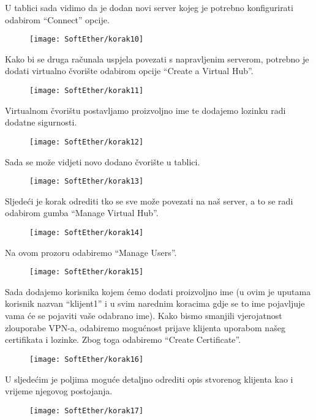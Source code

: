 \FloatBarrier
U tablici sada vidimo da je dodan novi server kojeg je potrebno konfigurirati odabirom ``Connect'' opcije.
\begin{figure}[h!]
     \centering
     \texttt{[image: SoftEther/korak10]}
\end{figure}
\FloatBarrier
Kako bi se druga računala uspjela povezati s napravljenim serverom, potrebno je dodati virtualno čvorište odabirom opcije ``Create a Virtual Hub''.
\begin{figure}[h!]
     \centering
     \texttt{[image: SoftEther/korak11]}
\end{figure}
\FloatBarrier
Virtualnom čvorištu postavljamo proizvoljno ime te dodajemo lozinku radi dodatne sigurnosti.
\begin{figure}[h!]
     \centering
     \texttt{[image: SoftEther/korak12]}
\end{figure}
\FloatBarrier
Sada se može vidjeti novo dodano čvorište u tablici.
\begin{figure}[h!]
     \centering
     \texttt{[image: SoftEther/korak13]}
\end{figure}
\FloatBarrier
Sljedeći je korak odrediti tko se sve može povezati na naš server, a to se radi odabirom gumba ``Manage Virtual Hub''.
\begin{figure}[h!]
     \centering
     \texttt{[image: SoftEther/korak14]}
\end{figure}
\FloatBarrier
Na ovom prozoru odabiremo ``Manage Users''.
\begin{figure}[h!]
     \centering
     \texttt{[image: SoftEther/korak15]}
\end{figure}
\FloatBarrier
Sada dodajemo korisnika kojem ćemo dodati proizvoljno ime (u ovim je uputama korisnik nazvan ``klijent1'' i u svim narednim koracima gdje se to ime pojavljuje vama će se pojaviti vaše odabrano ime). Kako bismo smanjili vjerojatnost zlouporabe VPN-a, odabiremo mogućnost prijave klijenta uporabom našeg certifikata i lozinke. Zbog toga odabiremo ``Create Certificate''.
\begin{figure}[h!]
     \centering
     \texttt{[image: SoftEther/korak16]}
\end{figure}
\FloatBarrier
U sljedećim je poljima moguće detaljno odrediti opis stvorenog klijenta kao i vrijeme njegovog postojanja.
\begin{figure}[h!]
     \centering
     \texttt{[image: SoftEther/korak17]}
\end{figure}
